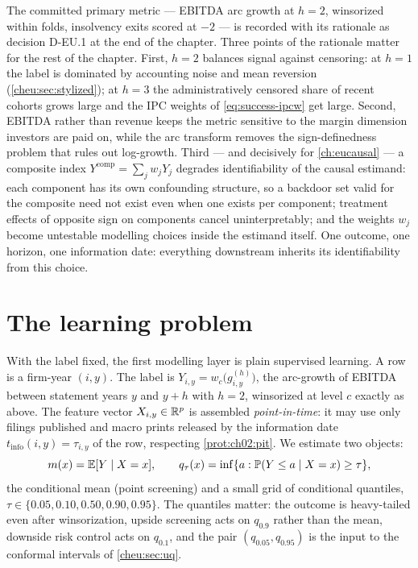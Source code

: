 The committed primary metric --- EBITDA arc growth at $h=2$, winsorized within folds, insolvency
exits scored at $-2$ --- is recorded with its rationale as decision D-EU.1 at the end of the
chapter. Three points of the rationale matter for the rest of the chapter. First, $h=2$
balances signal against censoring: at $h=1$ the label is dominated by accounting noise and mean
reversion (\cref{cheu:sec:stylized}); at $h=3$ the administratively censored share of recent
cohorts grows large and the IPC weights of \cref{eq:success-ipcw} get large. Second, EBITDA
rather than revenue keeps the metric sensitive to the margin dimension investors are paid on,
while the arc transform removes the sign-definedness problem that rules out log-growth. Third
--- and decisively for \cref{ch:eucausal} --- a composite index $Y^{\mathrm{comp}} = \sum_j w_j
Y_j$ degrades identifiability of the causal estimand: each component has its own confounding
structure, so a backdoor set valid for the composite need not exist even when one exists per
component; treatment effects of opposite sign on components cancel uninterpretably; and the
weights $w_j$ become untestable modelling choices inside the estimand itself. One outcome, one
horizon, one information date: everything downstream inherits its identifiability from this
choice.

\section{The learning problem}\label{cheu:sec:problem}

With the label fixed, the first modelling layer is plain supervised learning. A row is a
firm-year $(i,y)$. The label is $Y_{i,y} = w_c\!\bigl(g^{(h)}_{i,y}\bigr)$, the arc-growth of
EBITDA between statement years $y$ and $y+h$ with $h=2$, winsorized at level $c$ exactly as
above. The feature vector $X_{i,y} \in \mathbb{R}^p$ is assembled \emph{point-in-time}: it may use only
filings published and macro prints released by the information date $t_{\mathrm{info}}(i,y) =
\tau_{i,y}$ of the row, respecting \cref{prot:ch02:pit}. We estimate two objects:
\begin{equation}\label{eq:xgb-targets}
m(x) = \mathbb{E}[Y \mid X = x],
\qquad
q_\tau(x) = \inf\{a : \mathbb{P}(Y \le a \mid X = x) \ge \tau\},
\end{equation}
the conditional mean (point screening) and a small grid of conditional quantiles, $\tau \in
\{0.05, 0.10, 0.50, 0.90, 0.95\}$. The quantiles matter: the outcome is heavy-tailed even after
winsorization, upside screening acts on $q_{0.9}$ rather than the mean, downside risk control
acts on $q_{0.1}$, and the pair $(q_{0.05}, q_{0.95})$ is the input to the conformal intervals
of \cref{cheu:sec:uq}.


